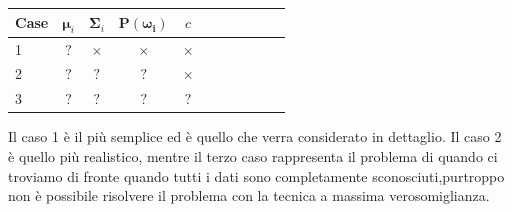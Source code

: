 \begin{table}[ht]
\centering
\begin{tabular}{l cccccccccc}
\hline
Case & $\mathbf{\mu}_i$  & $\mathbf{\Sigma}_i$ & $\mathbf{P(\omega_i)}$ & $c$\\
\hline
 1 &  $?$  & $\times$  &    $\times$   &  $\times$  \\
 2 & $?$ & $?$ & $?$ &    $\times$   \\
 3 & $?$ & $?$ & $?$ & $?$ \\
\hline
\end{tabular}
\end{table}
\noindent Il caso 1 è il più semplice ed è quello che verra considerato in dettaglio. Il caso 2 è quello più realistico, mentre il terzo caso rappresenta il problema di quando ci troviamo di fronte quando tutti i dati sono completamente sconosciuti,purtroppo non è possibile risolvere il problema con la tecnica a massima verosomiglianza. 

